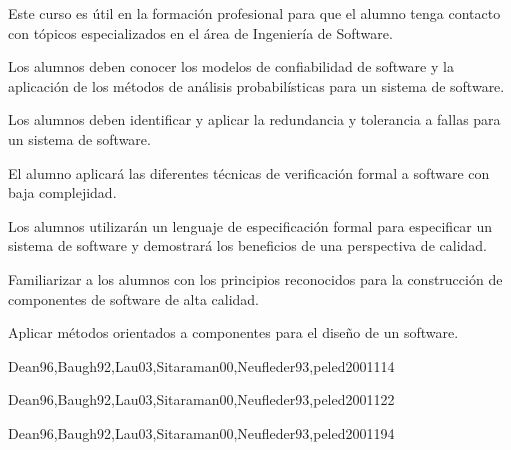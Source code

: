 \begin{syllabus}


\begin{justification}
Este curso es útil en la formación profesional para que el alumno tenga contacto con tópicos especializados  en el área de Ingeniería de Software.
\end{justification}

\begin{goals}
\item Los alumnos deben conocer los modelos de confiabilidad de software y la aplicación de los métodos de análisis probabilísticas para un sistema de software.
\item Los alumnos deben identificar y aplicar la redundancia y tolerancia a fallas para un sistema de software.
\item El alumno aplicará las diferentes técnicas de verificación formal a software con baja complejidad.
\item Los alumnos utilizarán un lenguaje de especificación formal para especificar un sistema de software y demostrará los beneficios de una perspectiva de calidad.
\item Familiarizar a los alumnos con los principios reconocidos para la construcción de componentes de software de alta calidad.
\item Aplicar métodos orientados a componentes para el diseño de un software.
\end{goals}

\begin{outcomes}
\end{outcomes}

\begin{unit}{\SESoftwareReliabilityDef}{Dean96,Baugh92,Lau03,Sitaraman00,Neufleder93,peled2001}{11}{4}
   \SESoftwareReliabilityAllTopics
   \SESoftwareReliabilityAllObjectives
\end{unit}

\begin{unit}{\SEFormalMethodsDef}{Dean96,Baugh92,Lau03,Sitaraman00,Neufleder93,peled2001}{12}{2}
   \SEFormalMethodsAllTopics
   \SEFormalMethodsAllObjectives
\end{unit}

\begin{unit}{\SEComponentBasedComputingDef}{Dean96,Baugh92,Lau03,Sitaraman00,Neufleder93,peled2001}{19}{4}
   \SEComponentBasedComputingAllTopics
   \SEComponentBasedComputingAllObjectives
\end{unit}



\begin{coursebibliography}
\end{coursebibliography}

\end{syllabus}
